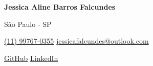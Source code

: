 \documentclass[a4paper,10pt]{article}
\begin{document}

\noindent
\begin{minipage}[t]{0.5\textwidth}
\textbf{\Large Jessica Aline Barros Falcundes}

\vspace{0.4em}

\end{minipage}%
\begin{minipage}[t]{0.5\textwidth}
\raggedleft

São Paulo - SP

{\color{blue}} \href{tel:+5567998748431}{\faPhone \space (11) 99767-0355}
{\color{blue}} \href{mailto:jessicafalcundes@outlook.com}{\faEnvelope \space jessicafalcundes@outlook.com}

\vspace{0.2em}
 \quad
{\color{blue}} \href{https://github.com/jessicafalcundes}{\faGithub \space GitHub} \quad
{\color{blue}} \href{https://www.linkedin.com/in/jessicafalcundes/}{\faLinkedin \space LinkedIn} \\
\end{minipage}

\vspace{1em}
\end{document}
